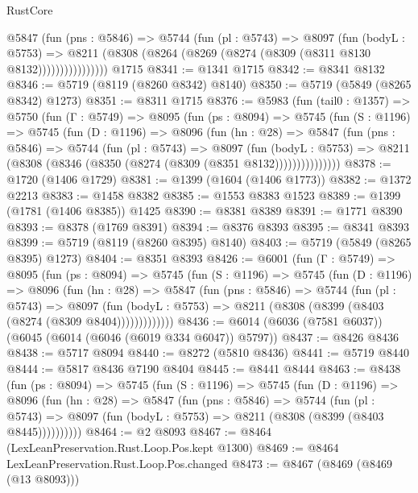 \begin{lexlean}{RustCore}
\begin{coremodule}
{\begin{coremodule}
{{{{{{{{{{{{{{{{{{{{{{{{{{{{{{{{{{{{{{{{{{{{                @5847
                  (fun (pns : @5846) =>
                  @5744
                    (fun (pl : @5743) =>
                    @8097
                      (fun (bodyL : @5753) =>
                      @8211 (@8308 (@8264 (@8269 (@8274 (@8309 (@8311 @8130 @8132))))))))))))))))
    @1715
@8341 := @1341 @1715
@8342 := @8341 @8132
@8346 := @5719 (@8119 (@8260 @8342) @8140)
@8350 := @5719 (@5849 (@8265 @8342) @1273)
@8351 := @8311 @1715
@8376 := @5983
    (fun (tail0 : @1357) =>
    @5750
      (fun (Γ : @5749) =>
      @8095
        (fun (ps : @8094) =>
        @5745
          (fun (S : @1196) =>
          @5745
            (fun (D : @1196) =>
            @8096
              (fun (hn : @28) =>
              @5847
                (fun (pns : @5846) =>
                @5744
                  (fun (pl : @5743) =>
                  @8097
                    (fun (bodyL : @5753) =>
                    @8211 (@8308 (@8346 (@8350 (@8274 (@8309 (@8351 @8132)))))))))))))))
@8378 := @1720 (@1406 @1729)
@8381 := @1399 (@1604 (@1406 @1773))
@8382 := @1372 @2213
@8383 := @1458 @8382
@8385 := @1553 @8383 @1523
@8389 := @1399 (@1781 (@1406 @8385)) @1425
@8390 := @8381 @8389
@8391 := @1771 @8390
@8393 := @8378 (@1769 @8391)
@8394 := @8376 @8393
@8395 := @8341 @8393
@8399 := @5719 (@8119 (@8260 @8395) @8140)
@8403 := @5719 (@5849 (@8265 @8395) @1273)
@8404 := @8351 @8393
@8426 := @6001
    (fun (Γ : @5749) =>
    @8095
      (fun (ps : @8094) =>
      @5745
        (fun (S : @1196) =>
        @5745
          (fun (D : @1196) =>
          @8096
            (fun (hn : @28) =>
            @5847
              (fun (pns : @5846) =>
              @5744
                (fun (pl : @5743) =>
                @8097
                  (fun (bodyL : @5753) =>
                  @8211 (@8308 (@8399 (@8403 (@8274 (@8309 @8404)))))))))))))
@8436 := @6014 (@6036 (@7581 @6037)) (@6045 (@6014 (@6046 (@6019 @334 @6047)) @5797))
@8437 := @8426 @8436
@8438 := @5717 @8094
@8440 := @8272 (@5810 @8436)
@8441 := @5719 @8440
@8444 := @5817 @8436 @7190 @8404
@8445 := @8441 @8444
@8463 := @8438
    (fun (ps : @8094) =>
    @5745
      (fun (S : @1196) =>
      @5745
        (fun (D : @1196) =>
        @8096
          (fun (hn : @28) =>
          @5847
            (fun (pns : @5846) =>
            @5744
              (fun (pl : @5743) =>
              @8097 (fun (bodyL : @5753) => @8211 (@8308 (@8399 (@8403 @8445))))))))))
@8464 := @2 @8093
@8467 := @8464 (LexLeanPreservation.Rust.Loop.Pos.kept @1300)
@8469 := @8464 LexLeanPreservation.Rust.Loop.Pos.changed
@8473 := @8467 (@8469 (@8469 (@13 @8093)))
}}}}}}}}}}}}}}}}}}}}}}}}}}}}}}}}}}}}}}}}}}}}
\end{coremodule}}
\end{coremodule}
\end{lexlean}
